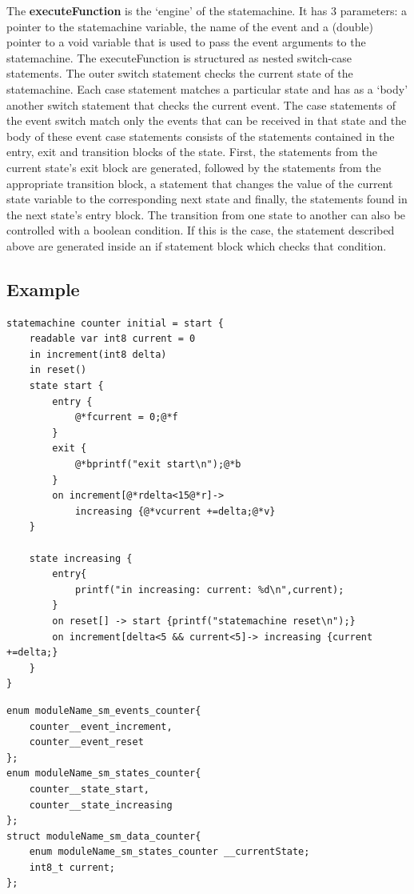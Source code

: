 \documentclass[a4paper,10pt,titlepage]{report}
\begin{document}
The \textbf{executeFunction} is the ‘engine’ of the statemachine. It has 3 parameters:  a pointer to the statemachine variable, the name of the event and a (double) pointer to a void variable that is used to pass the event arguments to the statemachine.
The executeFunction is structured as nested switch-case statements.
The outer switch statement checks the current state of the statemachine. Each case statement matches a particular state and has as a ‘body’ another switch statement that checks the current event. The case statements of the event switch match only the events  that can be received in that state and the body of these event case statements consists of the statements contained in the entry, exit and transition blocks of the state. First, the statements from the current state’s exit block are generated, followed by the statements from the appropriate transition block, a statement that changes the value of the current state variable to the corresponding next state and finally, the statements found in the next state’s entry block. 
The transition from one state to another can also be controlled with a boolean condition. If this is the case, the statement described above are generated inside an if statement block which checks that condition.

\newpage

\subsection{Example}

\begin{lstlisting}
statemachine counter initial = start { 
    readable var int8 current = 0
    in increment(int8 delta)  
    in reset()
    state start { 
        entry { 
            @*fcurrent = 0;@*f  
        } 
        exit {
            @*bprintf("exit start\n");@*b
        }  
        on increment[@*rdelta<15@*r]-> 
            increasing {@*vcurrent +=delta;@*v}
    }
	  
    state increasing {
        entry{
            printf("in increasing: current: %d\n",current);
        }
        on reset[] -> start {printf("statemachine reset\n");}
        on increment[delta<5 && current<5]-> increasing {current +=delta;}
    } 
}
\end{lstlisting}

\begin{lstlisting}
enum moduleName_sm_events_counter{
    counter__event_increment,
    counter__event_reset 
};
enum moduleName_sm_states_counter{
    counter__state_start,
    counter__state_increasing 
};
struct moduleName_sm_data_counter{
    enum moduleName_sm_states_counter __currentState;
    int8_t current;
};
\end{lstlisting}   
\end{document}
